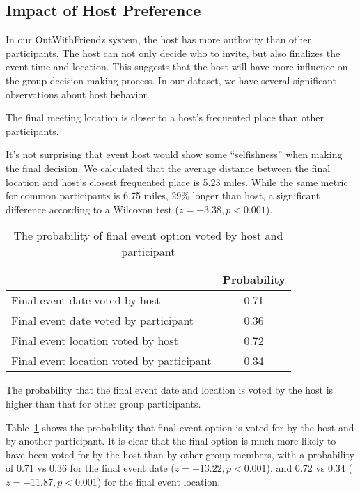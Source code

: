\subsection{Impact of Host Preference}
\label{sec:impact-host-preference}
In our OutWithFriendz system, the host has more authority than other
participants. The host can not only decide who to invite, but also finalizes the
event time and location. This suggests that the host will have more influence
on the group decision-making process. In our dataset, we have several
significant observations about host behavior.
\begin{observation}
The final meeting location is closer to a host's frequented place than
other participants.
\end{observation}
It's not surprising that event host would show some ``selfishness'' when making
the final decision. We calculated that the average distance between the final
location and host's closest frequented place is 5.23 miles. While the same
metric for common participants is 6.75 miles, 29\% longer than host, a
significant difference according to a Wilcoxon test ($z=-3.38, p<0.001$).

\begin{table}[]
\centering
\caption{The probability of final event option voted by host and participant}
\label{tab:prob}
\begin{tabular}{|l|c|}
\hline
                                          & Probability \\ \hline
Final event date voted by host            & 0.71        \\ \hline
Final event date voted by participant     & 0.36        \\ \hline
Final event location voted by host        & 0.72        \\ \hline
Final event location voted by participant & 0.34        \\ \hline
\end{tabular}
\end{table}

\begin{observation}
The probability that the final event date and location is voted by the host
is  higher than that for other group participants.
\end{observation}

Table~\ref{tab:prob} shows the probability that final event option is voted for
by the host and by another participant. It is clear that the final option is
much more likely to have been voted for by the host than by other group members,
with a probability of 0.71 vs 0.36 for the final event date ($z=-13.22,
p<0.001$). and 0.72 vs 0.34 ($z=-11.87, p<0.001$) for the final event location.

